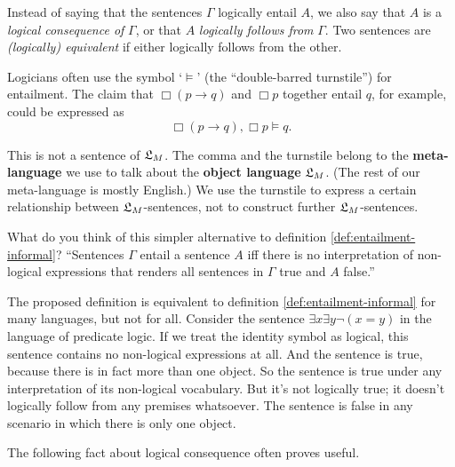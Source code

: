 Instead of saying that the sentences $\Gamma$ logically entail $A$, we also say
that $A$ is a \emph{logical consequence of} $\Gamma$, or that $A$
\emph{logically follows from} $\Gamma$. Two sentences are \emph{(logically)
  equivalent} if either logically follows from the other.

Logicians often use the symbol `$\models$' (the ``double-barred turnstile'') for
entailment. The claim that $\Box (p \to q)$ and $\Box p$ together entail $q$,
for example, could be expressed as
\begin{equation*}
  \Box (p \to q), \Box p \models q.
\end{equation*}

This is not a sentence of $\mathfrak{L}_{M}$. The comma and the turnstile belong to
the \textbf{meta-language} we use to talk about the \textbf{object language}
$\mathfrak{L}_M$. (The rest of our meta-language is mostly English.) We use the turnstile
to express a certain relationship between $\mathfrak{L}_M$-sentences, not to construct
further $\mathfrak{L}_{M}$-sentences.

\begin{exercise}
  What do you think of this simpler alternative to definition
  \ref{def:entailment-informal}? ``Sentences $\Gamma$ entail a sentence $A$ iff
  there is no interpretation of non-logical expressions that renders all
  sentences in $\Gamma$ true and $A$ false.''
\end{exercise}
\begin{solution}
  The proposed definition is equivalent to definition
  \ref{def:entailment-informal} for many languages, but not for all. Consider
  the sentence $\exists x \exists y \neg(x = y)$ in the language of predicate
  logic. If we treat the identity symbol as logical, this sentence contains no
  non-logical expressions at all. And the sentence is true, because there is in
  fact more than one object. So the sentence is true under any interpretation of
  its non-logical vocabulary. But it's not logically true; it doesn’t logically
  follow from any premises whatsoever. The sentence is false in any scenario in
  which there is only one object.
\end{solution}

The following fact about logical consequence often proves useful.

